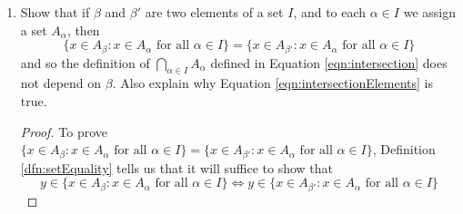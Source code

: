 \documentclass[../main.tex]{subfiles}
\begin{document}
\begin{enumerate}[ref={\thesection.\arabic*}]
    \begin{proof}
        To demonstrate Axiom \ref{axm:pairwiseUnion}, we must show that for any two sets $A,B$, there exists a set $A\cup B$ satisfying $x\in A\cup B$ iff $x\in A$ or $x\in B$.\par
        Let $A,B$ be sets. Then by Axiom \ref{axm:setsAreObjects}, $A$ and $B$ are objects. Thus, by Axiom \ref{axm:singletonPair}, we can create the pair set $\{A,B\}$. Since $\{A,B\}$ has only sets for elements, Axiom \ref{axm:union} applies, and implies the existence of $\bigcup\{A,B\}$, which we may denote by $A\cup B$. Axiom \ref{axm:union} also asserts that
        \begin{equation*}
            x\in A\cup B \Longleftrightarrow x\in S\text{ for some }S\in\{A,B\}
        \end{equation*}
        But by Axiom \ref{axm:singletonPair}, $S\in A\cup B$ iff $S=A$ or $S=B$. Therefore, we have
        \begin{equation*}
            x\in A\cup B \Longleftrightarrow x\in S\text{, }S\text{ being a set that satisfies }S=A\text{ or }S=B
        \end{equation*}
        or
        \begin{equation*}
            x\in A\cup B \Longleftrightarrow x\in A\text{ or }x\in B
        \end{equation*}
    \end{proof}
    \item \label{exr:3.4.9}Show that if $\beta$ and $\beta'$ are two elements of a set $I$, and to each $\alpha\in I$ we assign a set $A_\alpha$, then
    \begin{equation*}
        \{x\in A_\beta:x\in A_\alpha\text{ for all }\alpha\in I\} = \{x\in A_{\beta'}:x\in A_\alpha\text{ for all }\alpha\in I\}
    \end{equation*}
    and so the definition of $\bigcap_{\alpha\in I}A_\alpha$ defined in Equation \ref{eqn:intersection} does not depend on $\beta$. Also explain why Equation \ref{eqn:intersectionElements} is true.
    \begin{proof}
        To prove $\{x\in A_\beta:x\in A_\alpha\text{ for all }\alpha\in I\}=\{x\in A_{\beta'}:x\in A_\alpha\text{ for all }\alpha\in I\}$, Definition \ref{dfn:setEquality} tells us that it will suffice to show that
        \begin{equation*}
            y\in\{x\in A_\beta:x\in A_\alpha\text{ for all }\alpha\in I\} \Longleftrightarrow y\in\{x\in A_{\beta'}:x\in A_\alpha\text{ for all }\alpha\in I\}

\end{equation*}
\end{proof}
\end{enumerate}
\end{document}
